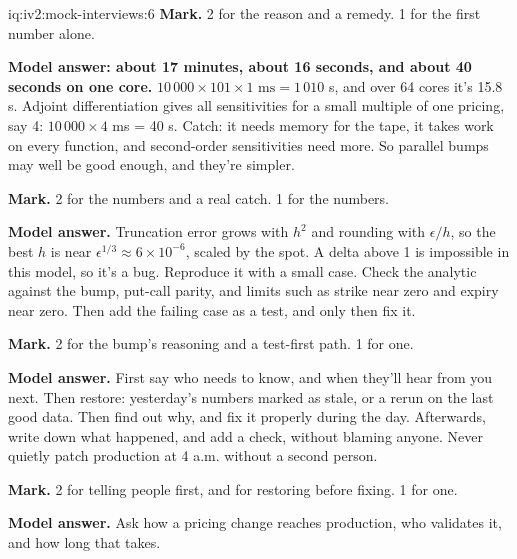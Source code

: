 \begin{solution}{iq:iv2:mock-interviews:6}
\textbf{Mark.} 2 for the reason and a remedy. 1 for the first number alone.

\ivstop
\textbf{Model answer: about 17 minutes, about 16 seconds, and about 40 seconds on one core.} $10\,000 \times 101 \times 1\text{ ms} = 1\,010$ s, and over 64 cores it's 15.8 s. Adjoint differentiation gives all sensitivities for a small multiple of one pricing, say 4: $10\,000 \times 4$ ms = 40 s. Catch: it needs memory for the tape, it takes work on every function, and second-order sensitivities need more. So parallel bumps may well be good enough, and they're simpler.

\textbf{Mark.} 2 for the numbers and a real catch. 1 for the numbers.

\ivstop
\textbf{Model answer.} Truncation error grows with $h^2$ and rounding with $\epsilon/h$, so the best $h$ is near $\epsilon^{1/3} \approx 6 \times 10^{-6}$, scaled by the spot. A delta above 1 is impossible in this model, so it's a bug. Reproduce it with a small case. Check the analytic against the bump, put-call parity, and limits such as strike near zero and expiry near zero. Then add the failing case as a test, and only then fix it.

\textbf{Mark.} 2 for the bump's reasoning and a test-first path. 1 for one.

\ivstop
\textbf{Model answer.} First say who needs to know, and when they'll hear from you next. Then restore: yesterday's numbers marked as stale, or a rerun on the last good data. Then find out why, and fix it properly during the day. Afterwards, write down what happened, and add a check, without blaming anyone. Never quietly patch production at 4 a.m. without a second person.

\textbf{Mark.} 2 for telling people first, and for restoring before fixing. 1 for one.

\ivstop
\textbf{Model answer.} Ask how a pricing change reaches production, who validates it, and how long that takes.


\end{solution}
